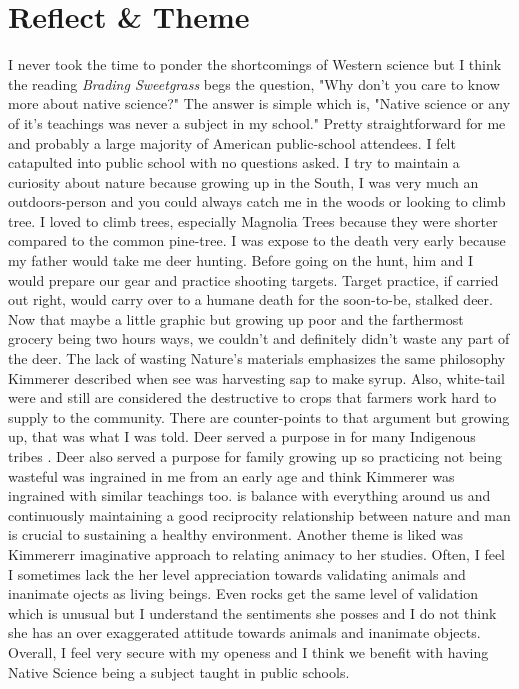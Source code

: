 \documentclass[a4paper,man,biblatex]{apa6}
\begin{document}
\section{Reflect \& Theme}
I never took the time to ponder the shortcomings of Western science but I think the reading \textit{Brading Sweetgrass} begs the question, "Why don’t you care to know more about  native science?" The answer is simple which is, "Native science or any of it’s teachings was never a subject in my school." Pretty straightforward for me and probably a large majority of American public-school attendees. I felt catapulted into public school with no questions asked. I try to maintain a curiosity about nature because growing up in the South, I was very much an outdoors-person and you could always catch me in the woods or looking to climb tree. I loved to climb trees, especially Magnolia Trees because they were shorter compared to the common pine-tree. I was expose to the death very early because my father would take me deer hunting. Before going on the hunt, him and I would prepare our gear and practice shooting targets. Target practice, if carried out right, would carry over to a humane death for the soon-to-be, stalked deer. Now that maybe a little graphic but growing up poor and the farthermost grocery being two hours ways, we couldn’t and definitely didn’t waste any part of the deer. The lack of wasting Nature’s materials emphasizes the same philosophy Kimmerer described when see was harvesting sap to make syrup. Also, white-tail were and still are considered the destructive to crops that farmers work hard to supply to the community. There are counter-points to that argument but growing up, that was what I was told. Deer served a purpose in for many Indigenous tribes \autocite{nativedeer}. Deer also served a purpose for family growing up so practicing not being wasteful was ingrained in me from an early age and think Kimmerer was ingrained with similar teachings too.\newline 
\parThere is balance with everything around us and continuously maintaining a good reciprocity relationship between nature and man is crucial to sustaining a healthy environment. Another theme is liked was Kimmererr imaginative approach to relating animacy to her studies. Often, I feel I sometimes lack the her level appreciation towards validating animals and inanimate ojects as living beings. Even rocks get the same level of validation which is unusual but I understand the sentiments she posses and I do not think she has an over exaggerated attitude towards animals and inanimate objects. Overall, I feel very secure with my openess and I think we benefit with having Native Science being a subject taught in public schools. 
\end{document}
